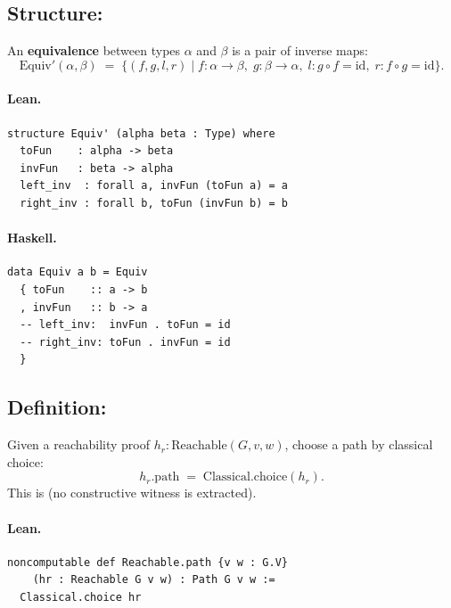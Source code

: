 \documentclass[11pt,a4paper]{article}
\begin{document}
\subsection{Structure: }

\begin{defn}
An \textbf{equivalence} between types $\alpha$ and $\beta$ is a pair of inverse
maps:
\[
  \mathrm{Equiv}'(\alpha, \beta) \;=\;
  \{ (f, g, l, r) \mid f : \alpha \to \beta,\; g : \beta \to \alpha,\;
    l : g \circ f = \mathrm{id},\; r : f \circ g = \mathrm{id} \}.
\]
\end{defn}

\paragraph{Lean.}
\begin{lstlisting}[style=lean]
structure Equiv' (alpha beta : Type) where
  toFun    : alpha -> beta
  invFun   : beta -> alpha
  left_inv  : forall a, invFun (toFun a) = a
  right_inv : forall b, toFun (invFun b) = b
\end{lstlisting}

\paragraph{Haskell.}
\begin{lstlisting}[style=haskell]
data Equiv a b = Equiv
  { toFun    :: a -> b
  , invFun   :: b -> a
  -- left_inv:  invFun . toFun = id
  -- right_inv: toFun . invFun = id
  }
\end{lstlisting}


\subsection{Definition: }

\begin{defn}
Given a reachability proof $h_r : \mathrm{Reachable}(G, v, w)$, choose a
path by classical choice:
\[
  h_r.\mathrm{path} \;=\; \mathrm{Classical.choice}(h_r).
\]
This is  (no constructive witness is extracted).
\end{defn}

\paragraph{Lean.}
\begin{lstlisting}[style=lean]
noncomputable def Reachable.path {v w : G.V}
    (hr : Reachable G v w) : Path G v w :=
  Classical.choice hr
\end{lstlisting}
\end{document}

